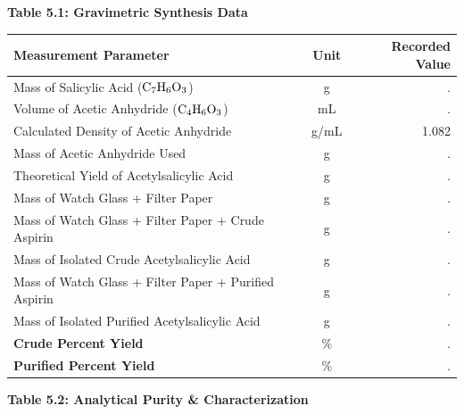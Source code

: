 \documentclass[10pt,a4paper]{article}
\begin{document}
\begin{tcolorbox}[
  enhanced,
  colback=white,
  colframe=BorderGray,
  boxrule=0.5pt,
  arc=3pt,
  left=8pt, right=8pt, top=6pt, bottom=6pt
]
\scriptsize
\textbf{Table 5.1: Gravimetric Synthesis Data}
\vspace{2pt}

\begin{tabularx}{\textwidth}{|X|c|r|}
  \hline
  \rowcolor{NavyDark}
  \color{white}\textbf{Measurement Parameter} & \color{white}\textbf{Unit} & \color{white}\textbf{Recorded Value} \\
  \hline
  Mass of Salicylic Acid ($\ce{C7H6O3}$) & g & \hspace{3cm} . \hspace{1cm} \\
  \hline
  Volume of Acetic Anhydride ($\ce{C4H6O3}$) & mL & . \hspace{1cm} \\
  \hline
  Calculated Density of Acetic Anhydride & g/mL & 1.082 \\
  \hline
  Mass of Acetic Anhydride Used & g & . \hspace{1cm} \\
  \hline
  Theoretical Yield of Acetylsalicylic Acid & g & . \hspace{1cm} \\
  \hline
  Mass of Watch Glass + Filter Paper & g & . \hspace{1cm} \\
  \hline
  Mass of Watch Glass + Filter Paper + Crude Aspirin & g & . \hspace{1cm} \\
  \hline
  Mass of Isolated Crude Acetylsalicylic Acid & g & . \hspace{1cm} \\
  \hline
  Mass of Watch Glass + Filter Paper + Purified Aspirin & g & . \hspace{1cm} \\
  \hline
  Mass of Isolated Purified Acetylsalicylic Acid & g & . \hspace{1cm} \\
  \hline
  \textbf{Crude Percent Yield} & \% & . \hspace{1cm} \\
  \hline
  \textbf{Purified Percent Yield} & \% & . \hspace{1cm} \\
  \hline
\end{tabularx}

\vspace{5pt}
\textbf{Table 5.2: Analytical Purity \& Characterization}
\vspace{2pt}


\end{tcolorbox}
\end{document}
